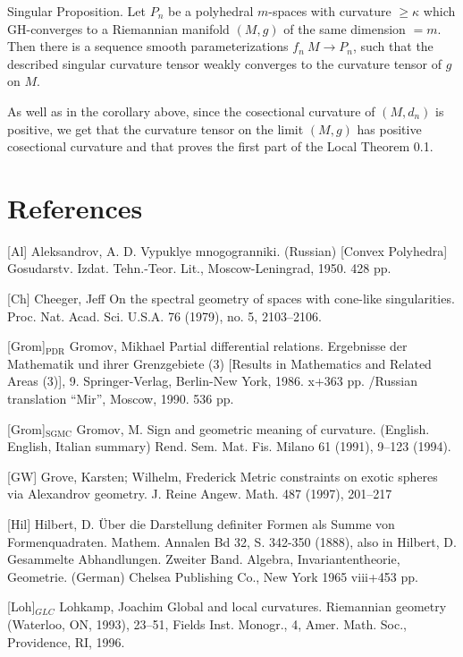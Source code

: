 \documentclass{article}
\begin{document}
\begin{thm}{Singular Proposition.} Let $P_n$ be a polyhedral $m$-spaces
with curvature $\ge \kappa$ which GH-converges to a Riemannian
manifold $(M,g)$ of the same dimension $=m$. Then there is a
sequence smooth parameterizations $f_n\:M\to P_n$, such that the
described singular curvature tensor  weakly converges to the
curvature tensor of $g$ on $M$.
\end{thm}


As well as in the corollary above, since the cosectional curvature of $(M,d_n)$ is positive, we get that the curvature tensor on the limit $(M,g)$ has positive cosectional curvature
and that proves the first part of the Local Theorem 0.1.



\section*{References}


[Al] Aleksandrov, A. D. Vypuklye mnogogranniki.
(Russian) [Convex Polyhedra] Gosudarstv. Izdat. Tehn.-Teor. Lit.,
Moscow-Leningrad, 1950. 428 pp.

[Ch] Cheeger, Jeff
On the spectral geometry of spaces with cone-like singularities.
Proc. Nat. Acad. Sci. U.S.A. 76 (1979), no. 5,
2103--2106.

[Grom]${}_{\text{PDR}}$ Gromov, Mikhael Partial differential relations.
Ergebnisse der Mathematik und ihrer Grenzgebiete
(3) [Results in Mathematics and Related Areas (3)],
9. Springer-Verlag, Berlin-New York, 1986. x+363 pp.
/Russian translation ``Mir'', Moscow, 1990. 536 pp.

[Grom]${}_{\text{SGMC}}$ Gromov, M.
Sign and geometric meaning of curvature. (English. English, Italian summary)
Rend. Sem. Mat. Fis. Milano 61 (1991), 9--123 (1994).

[GW] Grove, Karsten; Wilhelm, Frederick Metric constraints on exotic spheres via Alexandrov geometry. J. Reine Angew.
Math. 487 (1997), 201--217

[Hil] Hilbert, D.
\"Uber die Darstellung definiter Formen als Summe von Formenquadraten.
Mathem. Annalen Bd 32, S. 342-350 (1888), also in Hilbert, D.
Gesammelte Abhandlungen. Zweiter Band. Algebra,
Invariantentheorie, Geometrie. (German) Chelsea Publishing Co.,
New York 1965 viii+453 pp.

[Loh]$_{GLC}$ Lohkamp, Joachim Global and local curvatures.
Riemannian geometry (Waterloo, ON, 1993), 23--51, Fields Inst.
Monogr., 4, Amer. Math. Soc., Providence, RI, 1996.
\end{document}
